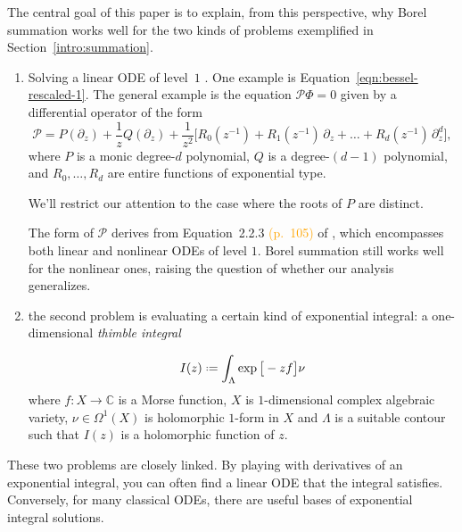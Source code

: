 \documentclass{article}
\theoremstyle{definition}
\newcommand*{\defeq}{\mathrel{\vcenter{\baselineskip0.5ex \lineskiplimit0pt
                     \hbox{\scriptsize.}\hbox{\scriptsize.}}}%
                     =}
\begin{document}
The central goal of this paper is to explain, from this perspective, why Borel summation works well for the two kinds of problems exemplified in Section~\ref{intro:summation}.
\begin{enumerate}
\item Solving a linear ODE of level~$1$ \cite[\S 2.1]{EcalleIII}\textcolor{DarkTurquoise}{\cite[Definition~5.5]{diverg-resurg-iii}}. One example is Equation~\eqref{eqn:bessel-rescaled-1}. The general example is the equation $\mathcal{P} \Phi = 0$ given by a differential operator of the form
\[ \mathcal{P} = P(\partial_z) + \frac{1}{z} Q(\partial_z) + \frac{1}{z^2}\big[ R_0(z^{-1}) + R_1(z^{-1})\,\partial_z + \ldots + R_d(z^{-1})\,\partial_z^d \big], \]
where $P$ is a monic degree-$d$ polynomial, $Q$ is a degree-$(d-1)$ polynomial, and $R_0, \ldots, R_d$ are entire functions of exponential type.

We'll restrict our attention to the case where the roots of $P$ are distinct.

The form of $\mathcal{P}$ derives from Equation~2.2.3 \textcolor{orange}{(p.~105)} of \cite{EcalleIII}, which encompasses both linear and nonlinear ODEs of level $1$. Borel summation still works well for the nonlinear ones, raising the question of whether our analysis generalizes.

\item the second problem is evaluating a certain kind of exponential integral: a one-dimensional {\em thimble integral}

\begin{equation}
I(z)\defeq\int_{\Lambda}\exp\big[-z f\big] \nu
\end{equation}
where $f\colon X\to \mathbb{C}$ is a Morse function, $X$ is $1$-dimensional complex algebraic variety, $\nu\in\Omega^1(X)$ is holomorphic $1$-form in $X$ and $\Lambda$ is a suitable contour such that $I(z)$ is a holomorphic function of $z$.  
\end{enumerate}

These two problems are closely linked. By playing with derivatives of an exponential integral, you can often find a linear ODE that the integral satisfies. Conversely, for many classical ODEs, there are useful bases of exponential integral solutions.

\end{document}
